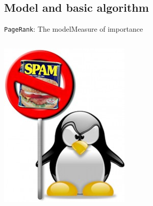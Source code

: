 \documentclass[xcolor=table,final]{beamer} %
\newcommand{\PageRank}{\texttt{PageRank}\xspace}
\begin{document}
\subsection{Model and basic algorithm}
\begin{frame}{\PageRank : The model}{Measure of importance}
  \begin{columns}
    \begin{column}{0.3\textwidth}
      \includegraphics[width=1.\textwidth]{figs/extras/penguin-no-spam}%
    \end{column}
    \begin{column}{0.7\textwidth}


      \begin{exampleblock}{}%


\end{exampleblock}
\end{column}
\end{columns}
\end{frame}
\end{document}
